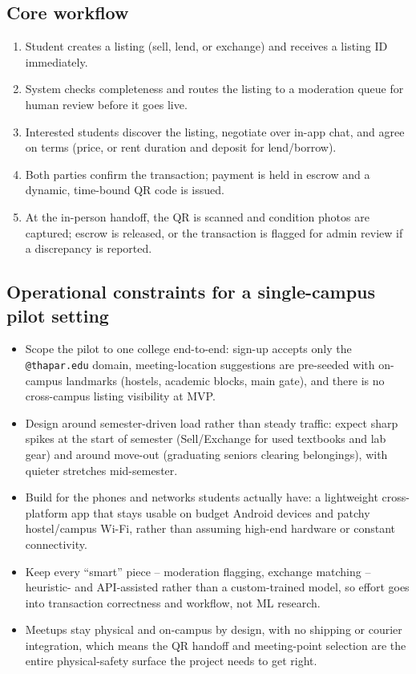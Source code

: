 \documentclass[11pt]{article}
\begin{document}
\subsection{Core workflow}
\begin{enumerate}[leftmargin=*]
\item Student creates a listing (sell, lend, or exchange) and receives a listing ID immediately.
\item System checks completeness and routes the listing to a moderation queue for human review before it goes live.
\item Interested students discover the listing, negotiate over in-app chat, and agree on terms (price, or rent duration and deposit for lend/borrow).
\item Both parties confirm the transaction; payment is held in escrow and a dynamic, time-bound QR code is issued.
\item At the in-person handoff, the QR is scanned and condition photos are captured; escrow is released, or the transaction is flagged for admin review if a discrepancy is reported.
\end{enumerate}

\subsection{Operational constraints for a single-campus pilot setting}
\begin{itemize}[leftmargin=*]
\item Scope the pilot to one college end-to-end: sign-up accepts only the \texttt{@thapar.edu} domain, meeting-location suggestions are pre-seeded with on-campus landmarks (hostels, academic blocks, main gate), and there is no cross-campus listing visibility at MVP.
\item Design around semester-driven load rather than steady traffic: expect sharp spikes at the start of semester (Sell/Exchange for used textbooks and lab gear) and around move-out (graduating seniors clearing belongings), with quieter stretches mid-semester.
\item Build for the phones and networks students actually have: a lightweight cross-platform app that stays usable on budget Android devices and patchy hostel/campus Wi-Fi, rather than assuming high-end hardware or constant connectivity.
\item Keep every ``smart'' piece -- moderation flagging, exchange matching -- heuristic- and API-assisted rather than a custom-trained model, so effort goes into transaction correctness and workflow, not ML research.
\item Meetups stay physical and on-campus by design, with no shipping or courier integration, which means the QR handoff and meeting-point selection are the entire physical-safety surface the project needs to get right.
\end{itemize}
\end{document}
